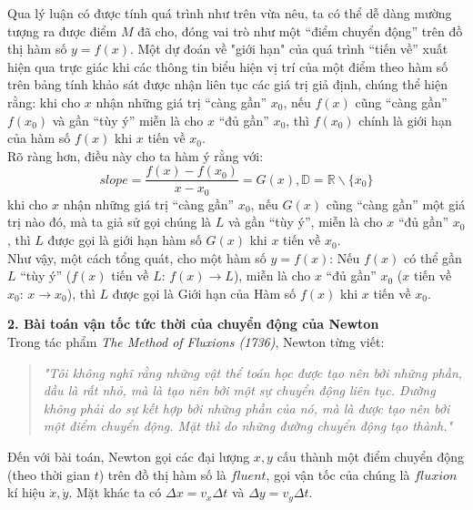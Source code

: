 \documentclass[a4paper,12pt]{article}
\begin{document}
Qua lý luận có được tính quá trình như trên vừa nêu, ta có thể dễ dàng mường tượng ra được điểm $M$ đã cho, đóng vai trò như một “điểm chuyển động” trên đồ thị hàm số $y=f(x)$. Một dự đoán về "giới hạn" của quá trình “tiến về” xuất hiện qua trực giác khi các thông tin biểu hiện vị trí của một điểm theo hàm số trên bảng tính khảo sát được nhận liên tục các giá trị giả định, chúng thể hiện rằng: khi cho $x$ nhận những giá trị “càng gần” $x_0$, nếu $f(x)$ cũng “càng gần” $f(x_0)$ và gần “tùy ý” miễn là cho $x$ “đủ gần” $x_0$, thì $f(x_0)$ chính là giới hạn của hàm số $f(x)$ khi $x$ tiến về $x_0$.\\

Rõ ràng hơn, điều này cho ta hàm ý rằng với: $$slope=\frac{f(x)-f(x_0)}{x-x_0}=G(x),  \mathbb{D}=\mathbb{R}\backslash{\{x_0\}}$$ khi cho $x$ nhận những giá trị “càng gần” $x_0$, nếu $G(x)$ cũng “càng gần” một giá trị nào đó, mà ta giả sử gọi chúng là $L$ và gần “tùy ý”, miễn là cho $x$ “đủ gần” $x_0$, thì $L$ được gọi là giới hạn hàm số $G(x)$ khi $x$ tiến về $x_0$.\\

Như vậy, một cách tổng quát, cho một hàm số $y=f(x)$: 
Nếu $f(x)$ có thể gần $L$ “tùy ý” ($f(x)$ tiến về $L$: $f(x) \to L$), miễn là cho $x$ “đủ gần” $x_0$ ($x$ tiến về $x_0$: $x \to x_0$), thì $L$ được gọi là Giới hạn của Hàm số $f(x)$ khi $x$ tiến về $x_0$.\\

\newpage

\textbf{2. Bài toán vận tốc tức thời của chuyển động của Newton}\\

Trong tác phẩm \textit{The Method of Fluxions (1736)}, Newton từng viết: 
\begin{quote}
	\textit{"Tôi không nghĩ rằng những vật thể toán học được tạo nên bởi những phần, dầu là rất nhỏ, mà là tạo nên bởi một sự chuyển động liên tục. Đường không phải do sự kết hợp bởi những phần của nó, mà là được tạo nên bởi một điểm chuyển động. Mặt thì do những đường chuyển động tạo thành."}
\end{quote}

Đến với bài toán, Newton gọi các đại lượng $x,y$ cấu thành một điểm chuyển động (theo thời gian $t$) trên đồ thị hàm số là $fluent$, gọi vận tốc của chúng là $fluxion$ kí hiệu $\dot{x}, \dot{y}$. Mặt khác ta có $\Delta x=v_x\Delta t$ và $\Delta y=v_y\Delta t$.\\
\end{document}
